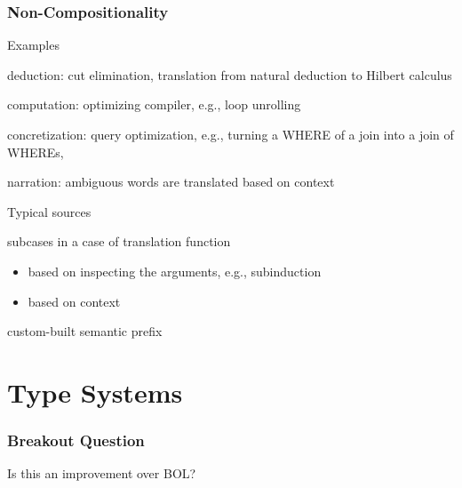 \begin{frame}\frametitle{Non-Compositionality}
\begin{blockitems}{Examples}
 \item deduction: cut elimination, translation from natural deduction to Hilbert calculus
 \item computation: optimizing compiler, e.g., loop unrolling
 \item concretization: query optimization, e.g., turning a WHERE of a join into a join of WHEREs,
 \item narration: ambiguous words are translated based on context
\end{blockitems}

\begin{blockitems}{Typical sources}
 \item subcases in a case of translation function
  \begin{itemize}
  \item based on inspecting the arguments, e.g., subinduction
  \item based on context
  \end{itemize}
 \item custom-built semantic prefix
\end{blockitems}
\end{frame}

\section{Type Systems}

\begin{frame}\frametitle{Breakout Question}
Is this an improvement over BOL?
\begin{commgrammar}
\\
\\
\\
\\
\\
\end{commgrammar}
\end{frame}

